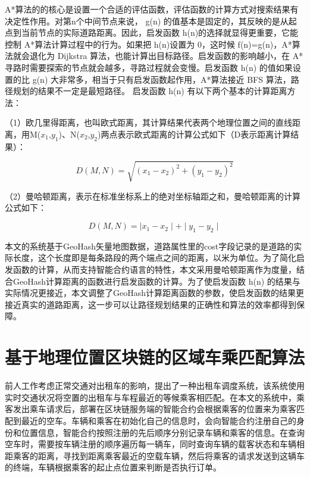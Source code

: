 A*算法的的核心是设置一个合适的评估函数，评估函数的计算方式对搜索结果有决定性作用。对第n个中间节点来说， g(n) 的值基本是固定的，其反映的是从起点到当前节点的实际道路距离。因此，启发函数 h(n)的选择就显得更重要，它能控制 A*算法计算过程中的行为。如果把 h(n)设置为 0，这时候 f(n)=g(n)，A*算法就会退化为 Dijkstra 算法，也能计算出目标路径。启发函数的影响越小，在 A*寻路时需要探索的节点就会越多，寻路过程就会变慢。启发函数 h(n) 的值如果设置的比 g(n) 大非常多，相当于只有启发函数起作用，A*算法接近 BFS 算法，路径规划的结果不一定是最短路径。
启发函数 h(n) 有以下两个基本的计算距离方法：

（1）欧几里得距离，也叫欧式距离，其计算结果代表两个地理位置之间的直线距离，用M($x_1$,$y_1$)、N($x_2$,$y_2$)两点表示欧式距离的计算公式如下（D表示距离计算结果）：

\begin{equation}
  \label{eqn:Euclid}
  D(M, N)=\sqrt{(x_1-x_2)^{2}+(y_1-y_2)^{2}}
\end{equation}

（2）曼哈顿距离，表示在标准坐标系上的绝对坐标轴距之和，曼哈顿距离的计算公式如下：

\begin{equation}
  \label{eqn:manhattan}
  D(M, N)=\mid x_1-x_2 \mid+\mid y_1-y_2 \mid
\end{equation}

本文的系统基于GeoHash矢量地图数据，道路属性里的cost字段记录的是道路的实际长度，这个长度即是每条路段的两个端点之间的距离，以米为单位。为了简化启发函数的计算，从而支持智能合约语言的特性，本文采用曼哈顿距离作为度量，结合GeoHash计算距离的函数进行启发函数的计算。为了使启发函数 h(n) 的结果与实际情况更接近，本文调整了GeoHash计算距离函数的参数，使启发函数的结果更接近真实的道路距离，这一步可以让路径规划结果的正确性和算法的效率都得到保障。

\section{基于地理位置区块链的区域车乘匹配算法}

前人工作考虑正常交通对出租车的影响，提出了一种出租车调度系统，该系统使用实时交通状况将空置的出租车与车程最近的等候乘客相匹配。在本文的系统中，乘客发出乘车请求后，部署在区块链服务端的智能合约会根据乘客的位置来为乘客匹配到最近的空车。车辆和乘客在初始化自己的信息时，会向智能合约注册自己的身份和位置信息，智能合约按照注册的先后顺序分别记录车辆和乘客的信息。在查询空车时，需要按车辆注册的顺序遍历每一辆车，同时查询车辆的载客状态和车辆相距乘客的距离，寻找到距离乘客最近的空载车辆，然后将乘客的请求发送到这辆车的终端，车辆根据乘客的起止点位置来判断是否执行订单。

